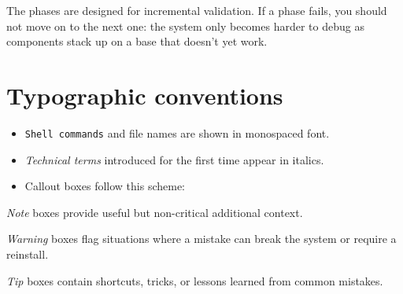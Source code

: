 \begin{note}
The phases are designed for incremental validation. If a phase fails, you should not move on to the next one: the system only becomes harder to debug as components stack up on a base that doesn't yet work.
\end{note}

\section{Typographic conventions}

\begin{itemize}
  \item \texttt{Shell commands} and file names are shown in monospaced font.
  \item \emph{Technical terms} introduced for the first time appear in italics.
  \item Callout boxes follow this scheme:
\end{itemize}

\begin{note}
\emph{Note} boxes provide useful but non-critical additional context.
\end{note}

\begin{warning}
\emph{Warning} boxes flag situations where a mistake can break the system or require a reinstall.
\end{warning}

\begin{tip}
\emph{Tip} boxes contain shortcuts, tricks, or lessons learned from common mistakes.
\end{tip}
